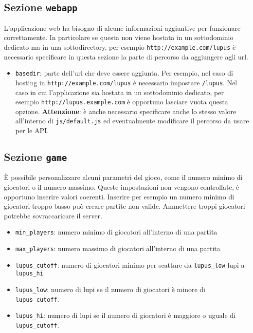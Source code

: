 \subsection{Sezione \texttt{webapp}}

L'applicazione web ha bisogno di alcune informazioni aggiuntive per funzionare correttamente. In particolare se questa non viene hostata in un sottodominio dedicato ma in una sottodirectory, per esempio \texttt{http://example.com/lupus} è necessario specificare in questa sezione la parte di percorso da aggiungere agli url.

\begin{itemize}[noitemsep,nolistsep]
	\item \texttt{basedir}: parte dell'url che deve essere aggiunta. Per esempio, nel caso di hosting in \texttt{http://example.com/lupus} è necessario impostare \texttt{/lupus}. Nel caso in cui l'applicazione sia hostata in un sottodominio dedicato, per esempio \texttt{http://lupus.example.com} è opportuno lasciare vuota questa opzione. \textbf{Attenzione}: è anche necessario specificare anche lo stesso valore all'interno di \texttt{js/default.js} ed eventualmente modificare il percorso da usare per le API.
\end{itemize}


\subsection{Sezione \texttt{game}}

È possibile personalizzare alcuni parametri del gioco, come il numero minimo di giocatori o il numero massimo. Queste impostazioni non vengono controllate, è opportuno inserire valori coerenti. Inserire per esempio un numero minimo di giocatori troppo basso può creare partite non valide. Ammettere troppi giocatori potrebbe sovraccaricare il server.

\begin{itemize}[noitemsep,nolistsep]
	\item \texttt{min\_players}: numero minimo di giocatori all'interno di una partita
	\item \texttt{max\_players}: numero massimo di giocatori all'interno di una partita
	\item \texttt{lupus\_cutoff}: numero di giocatori minimo per scattare da \texttt{lupus\_low} lupi a \texttt{lupus\_hi}
	\item \texttt{lupus\_low}: numero di lupi se il numero di giocatori è minore di \texttt{lupus\_cutoff}.
	\item \texttt{lupus\_hi}: numero di lupi se il numero di giocatori è maggiore o uguale di \texttt{lupus\_cutoff}.
\end{itemize}